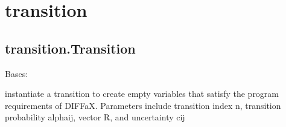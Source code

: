 \documentclass[letterpaper,10pt,english]{sphinxmanual}
\begin{document}
\begin{quote}
\end{quote}


\section{transition}
\label{\detokenize{rst/transition:transition}}\label{\detokenize{rst/transition::doc}}

\subsection{transition.Transition}
\label{\detokenize{rst/transition:transition-transition}}

\begin{fulllineitems}
\label{\detokenize{rst/transition:mstack.transition.Transition}}
Bases: 

instantiate a transition to create empty variables that satisfy the
program requirements of DIFFaX. Parameters include transition index n,
transition probability alphaij, vector R, and uncertainty cij


\begin{fulllineitems}
\end{fulllineitems}



\begin{fulllineitems}
\end{fulllineitems}



\begin{fulllineitems}
\end{fulllineitems}



\begin{fulllineitems}
\end{fulllineitems}



\begin{fulllineitems}
\end{fulllineitems}


\end{fulllineitems}
\end{document}
